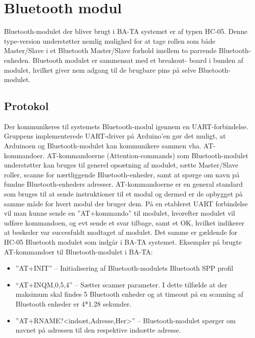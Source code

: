 \graphicspath{{Chapters/BluetoothModul/}}


\section{Bluetooth modul}

Bluetooth-modulet der bliver brugt i BA-TA systemet er af typen HC-05. Denne type-version understøtter nemlig mulighed for at tage rollen som både Master/Slave i et Bluetooth Master/Slave forhold imellem to parrende Bluetooth-enheden. Bluetooth modulet er sammensat med et breakout- board i bunden af modulet, hvilket giver nem adgang til de brugbare pins på selve Bluetooth-modulet.

\subsection{Protokol}
Der kommunikeres til systemets Bluetooth-modul igennem en UART-forbindelse. Gruppens implementerede UART-driver på Arduino’en gør det muligt, at Arduinoen og Bluetooth-modulet kan kommunikere sammen vha. AT-kommandoer. 
AT-kommandoerne (Attention-commands) som Bluetooth-modulet understøtter kan bruges til generel opsætning af modulet, sætte Master/Slave roller, scanne for nærtliggende Bluetooth-enheder, samt at spørge om navn på fundne Bluetooth-enheders adresser. AT-kommandoerne er en general standard som bruges til at sende instruktioner til et modul og dermed er de opbygget på samme måde for hvert modul der bruger dem. På en etableret UART forbindelse vil man kunne sende en ”AT+kommando” til modulet, hvorefter modulet vil udføre kommandoen, og evt sende et svar tilbage, samt et OK, hvilket indikerer at beskeder var succesfuldt modtaget af modulet. Det samme er gældende for HC-05 Bluetooth modulet som indgår i BA-TA systemet.
Eksempler på brugte AT-kommandoer til Bluetooth-modulet i BA-TA:

\begin{itemize}
	\item ”AT+INIT” – Initialisering af Bluetooth-modulets Bluetooth SPP profil
	\item “AT+INQM,0,5,4” – Sætter scanner parameter. I dette tilfælde at der maksimum skal findes 5 Bluetooth enheder og at timeout på en scanning af Bluetooth enheder er 4*1.28 sekunder.
	\item ”AT+RNAME?<indsæt,Adresse,Her>” – Bluetooth-modulet spørger om navnet på adressen til den respektive indsætte adresse.
\end{itemize}

